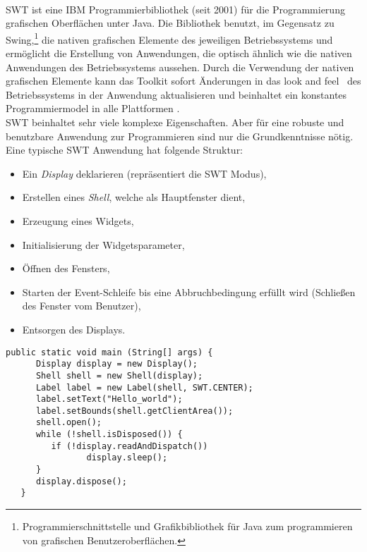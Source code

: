 \paragraph{}
SWT ist eine IBM Programmierbibliothek (seit 2001) für die Programmierung grafischen Oberflächen unter Java. Die Bibliothek benutzt, im Gegensatz zu Swing,\footnote{Programmierschnittstelle und Grafikbibliothek für Java zum programmieren von grafischen Benutzeroberflächen.} die nativen grafischen Elemente des jeweiligen Betriebssystems und ermöglicht die Erstellung von Anwendungen, die optisch ähnlich wie die nativen Anwendungen des Betriebssystems aussehen. Durch die Verwendung der nativen grafischen Elemente kann das Toolkit sofort Änderungen in das \glqq look and feel\grqq~ des Betriebssystems in der Anwendung aktualisieren und beinhaltet ein konstantes Programmiermodel in alle Plattformen
\cite{EclipseSWT}.\\

SWT beinhaltet sehr viele komplexe Eigenschaften. Aber für eine robuste und benutzbare Anwendung zur Programmieren sind nur die Grundkenntnisse nötig. Eine typische SWT Anwendung hat folgende Struktur:

\begin{itemize}
\item Ein \textit{Display} deklarieren (repräsentiert die SWT Modus),
\item Erstellen eines \textit{Shell}, welche als Hauptfenster dient,
\item Erzeugung eines Widgets,
\item Initialisierung der Widgetsparameter,
\item Öffnen des Fensters,
\item Starten der Event-Schleife bis eine Abbruchbedingung erfüllt wird (Schließen des Fenster vom Benutzer),
\item Entsorgen des Displays.
\end{itemize}

\begin{lstlisting}[caption={Beispiel einer SWT Anwendung}, captionpos=b]
   public static void main (String[] args) {
      Display display = new Display();
      Shell shell = new Shell(display);
      Label label = new Label(shell, SWT.CENTER);
      label.setText("Hello_world");
      label.setBounds(shell.getClientArea());
      shell.open();
      while (!shell.isDisposed()) {
         if (!display.readAndDispatch())
         		display.sleep();
      }
      display.dispose();
   }
\end{lstlisting}


